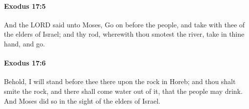 		\paragraph{Exodus 17:5} %
			\label{EXODUS-17-5}

			And the LORD said unto Moses, Go on before the people, and take with thee of the elders of Israel; and thy rod, wherewith thou smotest the river, take in thine hand, and go.


		\paragraph{Exodus 17:6} %
			\label{EXODUS-17-6}

			Behold, I will stand before thee there upon the rock in Horeb; and thou shalt smite the rock, and there shall come water out of it, that the people may drink. And Moses did so in the sight of the elders of Israel.

